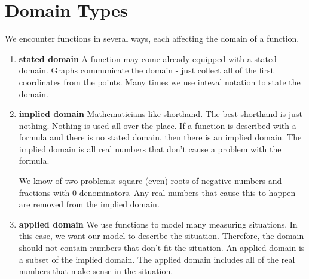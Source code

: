 \documentclass{ximera}
\begin{document}
\section{Domain Types}

We encounter functions in several ways, each affecting the domain of a function.

\begin{enumerate}
\item  \textbf{stated domain}
A function may come already equipped with a stated domain.  Graphs communicate the domain - just collect all of the first coordinates from the points. Many times we use inteval notation to state the domain.


\item  \textbf{implied domain}
Mathematicians like shorthand. The best shorthand is just nothing.  Nothing is used all over the place. If a function is described with a formula and there is no stated domain, then there is an implied domain.  The implied domain is all real numbers that don't cause a problem with the formula.

We know of two problems: square (even) roots of negative numbers and fractions with $0$ denominators.  Any real numbers that cause this to happen are removed from the implied domain.


\item  \textbf{applied domain}
We use functions to model many measuring situations. In this case, we want our model to describe the situation.  Therefore, the domain should not contain numbers that don't fit the situation. An applied domain is a subset of the implied domain.  The applied domain includes all of the real numbers that make sense in the situation.

\end{enumerate}
\end{document}

